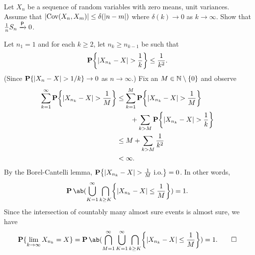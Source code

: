 \documentclass[12pt]{article}
\begin{document}
\begin{problem*}
    Let $X_n$ be a sequence of random variables with zero means, unit
    variances.
    Assume that $\lvert\operatorname{Cov}(X_n, X_m)\rvert \le \delta(\lvert n-m\rvert)$ where
    $\delta(k) \to 0$ as $k \to \infty$.
    Show that $\frac1n S_n \xrightarrow{\mathsf{P}} 0$.
\end{problem*}
\begin{solution}
    Let $n_1 = 1$ and for each $k \ge 2$, let $n_k \ge n_{k-1}$ be such that
    \[
        \P\set*{\abs{X_{n_k} - X} > \frac 1k} \le \frac 1{k^2}.
    \] (Since $\operatorname{\mathbf P}\{\lvert X_n - X\rvert > 1/k\} \to 0$ as $n \to \infty$.)
    Fix an $M \in \mathbb{N} \setminus \{0\}$ and observe \begin{align*}
        \sum_{k=1}^\infty \P\set*{\abs{X_{n_k} - X} > \frac 1M}
            &\le \sum_{k=1}^M \P\set*{\abs{X_{n_k} - X} > \frac 1M} \\
            &\qquad+ \sum_{k > M} \P\set*{\abs{X_{n_k} - X} > \frac 1k} \\
            &\le M + \sum_{k > M} \frac 1{k^2} \\
            &< \infty.
    \end{align*}
    By the Borel-Cantelli lemma,
    $\P\set*{\abs{X_{n_k} - X} > \frac 1M \text{ i.o.}} = 0$.
    In other words, \[
        \P\ab(\bigcup_{K=1}^\infty \bigcap_{k \ge K}
            \set*{\abs{X_{n_k} - X} \le \frac 1M})
                = 1.
    \]
    Since the intersection of countably many almost sure events is almost
    sure, we have \[
        \P\set{\lim_{k \to \infty} X_{n_k} = X}
        = \P\ab(\bigcap_{M=1}^\infty \bigcup_{K=1}^\infty \bigcap_{k \ge K}
            \set*{\abs{X_{n_k} - X} \le \frac 1M})
        = 1. \qedhere
    \]
\end{solution}
\end{document}
